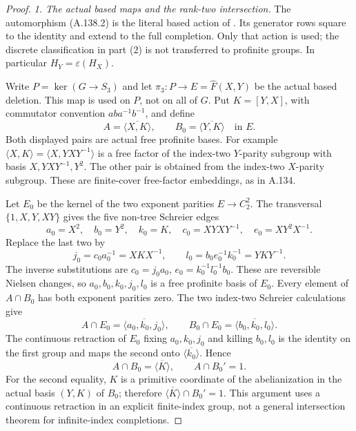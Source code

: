 \begin{proof}
\emph{1. The actual based maps and the rank-two intersection.}
The automorphism (A.138.2) is the literal based action of
\citet[Proposition~2.5(1) and Remark~2.8]{A_Enriquez2014}.
Its generator rows square to the identity and extend to the
full completion. Only that action is used; the discrete
classification in part (2) is not transferred to profinite groups.
In particular \(H_Y=\varepsilon(H_X)\).

Write \(P=\ker(G\to S_3)\) and let
\(\pi_3:P\to E=\widehat F(X,Y)\) be the actual based deletion.
This map is used on \(P\), not on all of \(G\).
Put \(K=[Y,X]\), with commutator convention \(aba^{-1}b^{-1}\),
and define
\[
 A=\overline{\langle X,K\rangle},\qquad
 B_0=\overline{\langle Y,K\rangle}\quad\text{in }E.
 \tag{A.138.4}
\]
Both displayed pairs are actual free profinite bases. For example
\(\langle X,K\rangle=\langle X,YXY^{-1}\rangle\) is a free
factor of the index-two \(Y\)-parity subgroup with basis
\(X,YXY^{-1},Y^2\). The other pair is obtained from the
index-two \(X\)-parity subgroup. These are finite-cover
free-factor embeddings, as in A.134.

Let \(E_0\) be the kernel of the two exponent parities
\(E\to C_2^2\). The transversal \(\{1,X,Y,XY\}\) gives
the five non-tree Schreier edges
\[
 a_0=X^2,\quad b_0=Y^2,\quad k_0=K,\quad
 c_0=XYXY^{-1},\quad e_0=XY^2X^{-1}.
 \tag{A.138.5}
\]
Replace the last two by
\[
 j_0=c_0a_0^{-1}=XKX^{-1},\qquad
 l_0=b_0e_0^{-1}k_0^{-1}=YKY^{-1}.
 \tag{A.138.6}
\]
The inverse substitutions are
\(c_0=j_0a_0\), \(e_0=k_0^{-1}l_0^{-1}b_0\).
These are reversible Nielsen changes, so
\(a_0,b_0,k_0,j_0,l_0\) is a free profinite basis of \(E_0\).
Every element of \(A\cap B_0\) has both exponent parities zero.
The two index-two Schreier calculations give
\[
 A\cap E_0=\overline{\langle a_0,k_0,j_0\rangle},\qquad
 B_0\cap E_0=\overline{\langle b_0,k_0,l_0\rangle}.
 \tag{A.138.7}
\]
The continuous retraction of \(E_0\) fixing
\(a_0,k_0,j_0\) and killing \(b_0,l_0\) is the identity
on the first group and maps the second onto
\(\overline{\langle k_0\rangle}\). Hence
\[
 A\cap B_0=\overline{\langle K\rangle},\qquad
 A\cap B_0'=1.
 \tag{A.138.8}
\]
For the second equality, \(K\) is a primitive coordinate of
the abelianization in the actual basis \((Y,K)\) of \(B_0\);
therefore \(\overline{\langle K\rangle}\cap B_0'=1\).
This argument uses a continuous retraction in an explicit
finite-index group, not a general intersection theorem for
infinite-index completions.


\end{proof}
